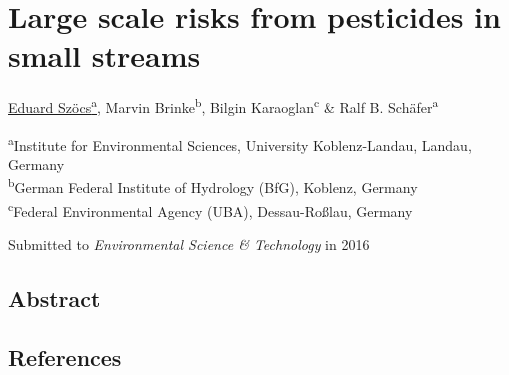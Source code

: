 \chapter{Large scale risks from pesticides in small streams}
\label{sec:smallstreams}  

\begin{sloppypar}
\bigskip
\underline{Eduard Szöcs\textsuperscript{a}}, Marvin Brinke\textsuperscript{b}, Bilgin Karaoglan\textsuperscript{c} \& Ralf B. Schäfer\textsuperscript{a}

\bigskip
\small
\noindent 
\textsuperscript{a}Institute for Environmental Sciences, University Koblenz-Landau, Landau, Germany \\
\textsuperscript{b}German Federal Institute of Hydrology (BfG), Koblenz, Germany \\
\textsuperscript{c}Federal Environmental Agency (UBA), Dessau-Roßlau, Germany

\bigskip 
\normalsize
\noindent
Submitted to \emph{Environmental Science \& Technology} in 2016

\end{sloppypar}
\newpage


\section{Abstract}



\section{References}
\printbibliography[heading=none]

